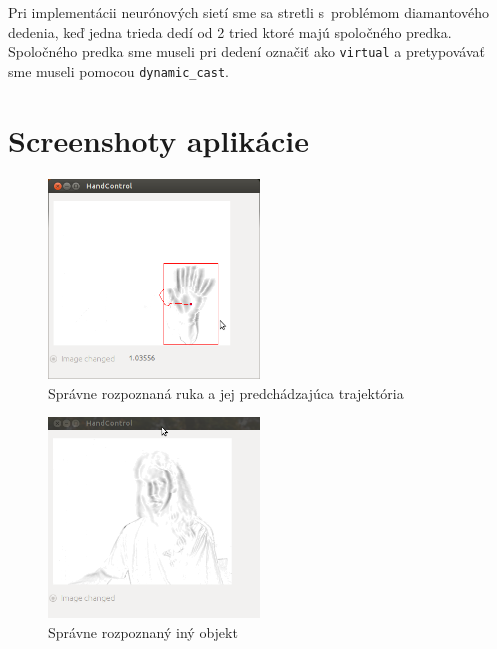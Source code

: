 Pri implementácii neurónových sietí sme sa stretli s~problémom diamantového dedenia, keď  jedna trieda dedí od 2 tried ktoré majú spoločného predka. 
Spoločného predka sme museli pri dedení označiť ako {\tt virtual} a pretypovávať sme museli pomocou {\tt dynamic\_cast}.

\section{Screenshoty aplikácie}

\begin{figure}[h]
    \centering
    \includegraphics[width=0.5\textwidth]{images/Screenshot_ruka}
    \caption{Správne rozpoznaná ruka a jej predchádzajúca trajektória }
\end{figure}

\begin{figure}[h]
    \centering
    \includegraphics[width=0.5\textwidth]{images/Screenshot_clovek}
    \caption{Správne rozpoznaný iný objekt}
\end{figure}

